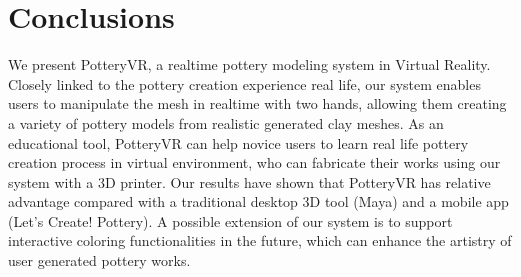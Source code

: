 \section{Conclusions}
\label{sec:8}

We present PotteryVR, a realtime pottery modeling system in Virtual Reality.
Closely linked to the pottery creation experience real life, our system enables users to manipulate the mesh in realtime with two hands, allowing them creating a variety of pottery models from realistic generated clay meshes.
As an educational tool, PotteryVR can help novice users to learn real life pottery creation process in virtual environment, who can fabricate their works using our system with a 3D printer.
Our results have shown that PotteryVR has relative advantage compared with a traditional desktop 3D tool (Maya) and a mobile app (Let's Create! Pottery).
A possible extension of our system is to support interactive coloring functionalities in the future, which can enhance the artistry of user generated pottery works.


\begin{acknowledgements}
\end{acknowledgements}


%
%



